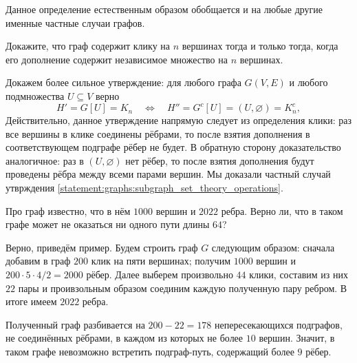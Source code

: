 Данное определение естественным образом обобщается и на любые другие именные частные случаи графов.


\begin{Exercise}[counter=SecExercise, label={exercise:graphs:clique_independent_set}]
    \noindent
    Докажите, что граф содержит клику на $ n $ вершинах тогда и только тогда,
    когда его дополнение содержит независимое множество на $ n $ вершинах.
\end{Exercise}

\begin{Answer}
    \noindent
    Докажем более сильное утверждение:
    для любого графа $ G(V, E) $ и любого подмножества $ U \subseteq V $ верно
    \[
        H' = G[U] = K_n \quad \Longleftrightarrow \quad H'' = G^c[U] = (U, \varnothing) = K_n^c,
    \]
    Действительно, данное утверждение напрямую следует из определения клики:
    раз все вершины в клике соединены рёбрами, то после взятия дополнения в соответствующем подграфе рёбер не будет.
    В обратную сторону доказательство аналогичное: раз в $ (U, \varnothing) $ нет рёбер,
    то после взятия дополнения будут проведены рёбра между всеми парами вершин.
    Мы доказали частный случай утврждения \ref{statement:graphs:subgraph_set_theory_operations}.
\end{Answer}


\begin{Exercise}[counter=SecExercise, label={exercise:graphs:disjoined}]
    \noindent
    Про граф известно, что в нём $ 1000 $ вершин и $ 2022 $ ребра.
    Верно ли, что в таком графе может не оказаться ни одного пути длины $ 64 $?
\end{Exercise}

\begin{Answer}
    \noindent
    Верно, приведём пример.
    Будем строить граф $ G $ следующим образом:
    сначала добавим в граф $ 200 $ клик на пяти вершинах;
    получим $ 1000 $ вершин и $ 200 \cdot 5 \cdot 4 / 2 = 2000 $ рёбер.
    Далее выберем произвольно $ 44 $ клики, составим из них $ 22 $ пары
    и проивзольным образом соединим каждую полученную пару ребром.
    В итоге имеем $ 2022 $ ребра.

    Полученный граф разбивается на $ 200 - 22 = 178 $ непересекающихся подграфов,
    не соединённых рёбрами, в каждом из которых не более $ 10 $ вершин.
    Значит, в таком графе невозможно встретить подграф-путь,
    содержащий более $ 9 $ рёбер.
\end{Answer}


